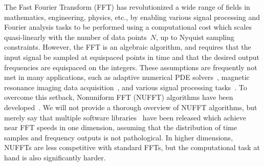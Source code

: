 
The Fast Fourier Transform (FFT) has revolutionized a wide range of fields in
mathematics, engineering, physics, etc., by enabling various signal processing
and Fourier analysis tasks to be performed using a computational cost which
scales quasi-linearly with the number of data points~$N$, up to Nyquist sampling
constraints. However, the FFT is an algebraic algorithm, and requires that the
input signal be sampled at equispaced points in time and that the desired output
frequencies are equispaced on the integers. These assumptions are frequently not
met in many applications, such as adaptive numerical PDE solvers~\cite{},
magnetic resonance imaging data acquisition~\cite{}, and various signal
processing tasks~\cite{}. To overcome this setback, Nonuniform FFT (NUFFT)
algorithms have been developed~\cite{}. We will not provide a thorough overview
of NUFFT algorithms, but merely say that multiple software libraries~\cite{}
have been released which achieve near FFT speeds in one dimension, assuming that
the distribution of time samples and frequency outputs is not pathological. In
higher dimensions, NUFFTs are less competitive with standard FFTs, but the
computational task at hand is also significantly harder.

